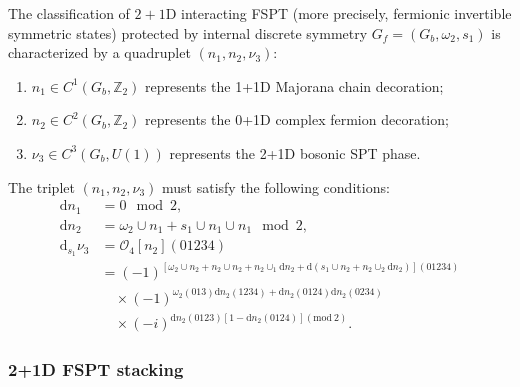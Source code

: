 \documentclass[%
 reprint,
 amsmath,amssymb,
 aps,
prb,
]{revtex4-2}
\begin{document}
The classification of $2+1$D interacting FSPT (more precisely, fermionic invertible symmetric states) protected by internal discrete symmetry $G_f = (G_b, \omega_2, s_1)$ is characterized by a quadruplet $(n_1,n_2,\nu_3)$:  
\begin{enumerate}
\item  $n_1 \in C^1(G_b, \mathbb Z_2)$ represents the 1+1D Majorana chain decoration; 
\item  $n_2 \in C^2(G_b, \mathbb Z_2)$ represents the 0+1D complex fermion decoration;
\item  $\nu_3 \in C^3(G_b, U(1))$ represents the 2+1D bosonic SPT phase.
\end{enumerate}
The triplet $( n_{1} ,n_{2} ,\nu _{3})$ must satisfy the following conditions:
\begin{align}
\mathrm{d} n_{1} &=0 \mod 2 ,\\
\mathrm{d} n_{2} &=\omega _{2} \cup n_{1} +s_{1} \cup n_{1} \cup n_{1} \mod 2 ,\\
\mathrm{d}_{s_1} \nu _{3} &=\mathcal{O}_{4}[ n_{2}]( 01234)\nonumber\\\nonumber
&=( -1)^{[ \omega _{2} \cup n_{2} +n_{2} \cup n_{2} +n_{2} \cup _{1}\mathrm{d} n_{2} +\mathrm{d}( s_{1} \cup n_{2} +n_{2} \cup _{2}\mathrm{d} n_{2})]( 01234)}\\\nonumber
&\quad\times ( -1)^{\omega _{2}( 013)\mathrm{d} n_{2}( 1234) +\mathrm{d} n_{2}( 0124)\mathrm{d} n_{2}( 0234)}\\
&\quad\times ( -i)^{\mathrm{d} n_{2}( 0123)[ 1-\mathrm{d} n_{2}( 0124)] (\mathrm{mod}\ 2)}
.
\end{align}


\subsubsection{2+1D FSPT stacking}
\end{document}
